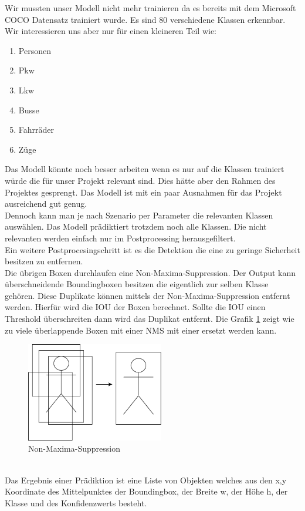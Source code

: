 \documentclass[conference]{IEEEtran}
\begin{document}
	Wir mussten unser Modell nicht mehr trainieren da es bereits mit dem Microsoft COCO Datensatz trainiert wurde. Es sind 80 verschiedene Klassen erkennbar. Wir interessieren uns aber nur für einen kleineren Teil wie:
	\begin{enumerate}
		\item Personen
		\item Pkw
		\item Lkw
		\item Busse
		\item Fahrräder
		\item Züge
	\end{enumerate}
	Das Modell könnte noch besser arbeiten wenn es nur auf die Klassen trainiert würde die für unser Projekt relevant sind. Dies hätte aber den Rahmen des Projektes gesprengt. Das Modell ist mit ein paar Ausnahmen für das Projekt ausreichend gut genug.\\
	Dennoch kann man je nach Szenario per Parameter die relevanten Klassen auswählen. Das Modell prädiktiert trotzdem noch alle Klassen. Die nicht relevanten werden einfach nur im Postprocessing herausgefiltert.\\
	Ein weitere Postprocesingschritt ist es die Detektion die eine zu geringe Sicherheit besitzen zu entfernen.\\
	Die übrigen Boxen durchlaufen eine Non-Maxima-Suppression.
	Der Output kann überschneidende Boundingboxen besitzen die eigentlich zur selben Klasse gehören. Diese Duplikate können mittels der Non-Maxima-Suppression entfernt werden. Hierfür wird die IOU der Boxen berechnet. Sollte die IOU einen Threshold überschreiten dann wird das Duplikat entfernt. Die Grafik \ref{NMS} zeigt wie zu viele überlappende Boxen mit einer NMS mit einer ersetzt werden kann.\\
	\begin{figure}[!h]
		\begin{center}
			\includegraphics[width=6cm]{Media/NMS.png}
			\caption{Non-Maxima-Suppression}
			\label{NMS}
		\end{center}
	\end{figure}\\
	Das Ergebnis einer Prädiktion ist eine Liste von Objekten welches aus den x,y Koordinate des Mittelpunktes der Boundingbox, der Breite w, der Höhe h, der Klasse und des Konfidenzwerts besteht.
	
\end{document}
